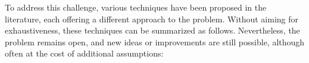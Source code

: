 


To address this challenge, various techniques have been proposed in the literature, each offering a different approach to the problem. Without aiming for exhaustiveness, these techniques can be summarized as follows. Nevertheless, the problem remains open, and new ideas or improvements are still possible, although often at the cost of additional assumptions:

